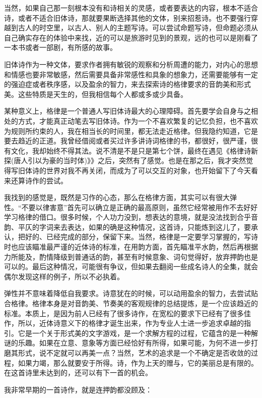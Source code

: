 \documentclass{article}
\begin{document}
当然，如果自己那一刻根本没有和诗相关的灵感，或者要表达的内容，根本不适合诗，或者不适合旧体诗，那就要果断选择其他的文体，别来招惹诗。也不要强行穿越到古人的时空里，以古人、别人的主题写诗。可以尝试命题写诗，但命题必须从自己确实存在的体验中来找，近的可以是旅游时见到的景观，远的也可以是刚看了一本书或者一部剧，有所感的故事。

旧体诗作为一种文体，要求作者拥有敏锐的观察和分析周遭的能力，对内心的思想和情感也要非常敏感，然后需要具备非常感性和具象的想象力，还需要能够有一定的强迫症或者秩序感，以及盈余的智力，来去探索诗的格律要求的音韵美和形式美。这些特质是天生的，但我相信每个人都或多或少具备。

某种意义上，格律是一个普通人写旧体诗最大的心理障碍。首先要学会自身与之相处的方式，才能真正动笔去写旧体诗。作为一个不喜欢繁复的记忆负担，也不喜欢为规则所约束的人，我在相当长的时间里，都无法走近格律。但我隐约知道，它是要去趋近的正道。我曾经借阅或者买过许多讲诗词格律的书，都很好，很严谨，很有文化，我却始终不得其法。说不清是不是只是第七个饼，最终在遇见《格律诗新探(唐人引以为豪的当时体)》》之后，突然有了感觉。也是在那之后，我才突然觉得写旧体诗的世界对我不再关闭，而成为了可以交互的对象，也开始留下了今天看来还算诗作的尝试。

我找到的感觉是，既然是习作的心态，那么在格律方面，其实可以有很大弹性。``不要以律害意''首先可以确立是正确的最高原则，虽然它经常被用作不去好好学习格律的借口。很多时候，个人功力没到，想表达的意境，就是没法找到合乎音韵、平仄的字词来去表达，如果的确是这种情况，这首诗，只能炼到这儿了，要承认，把好的、已经完成的部分，保留下来。当然，格律是一定要学习掌握的，写诗时也应该瞄准最严谨的近体诗的标准，在用韵方面，首先瞄准平水韵，然后再根据力所能及，酌情降级到普通话的韵，甚至有时候意象、词句觉得好，放弃押韵也是可以的。最后这种情况，可能很有争议，但如果去翻阅一些成名诗人的全集，就会偶尔发现这样的例子，所以不必执着。

弹性并不意味着降低自我要求。诗意犹在的时候，可以动用盈余的智力，去尝试贴合格律。格律本身是对音韵美、节奏美的客观规律的总结提炼，是一个应该趋近的标准。本质上，是因为前人已经有了很多诗作，在宽松的要求下已经有了很多佳作，所以，近体诗意义下的格律才诞生出来，作为专业人士进一步追求卓越的指引。它是一个关于形式美的文字游戏，是一个求解方程的过程，它蕴含的是一种解谜的乐趣。如果在立意、意象等方面已经恰好有所得，如果可能，为何不进一步打磨其形式，说不定就可以再美一点？当然，艺术的追求是一个不确定是否收敛的过程，如果力竭，那么就要安于所得。诗，作为上天的赠与，它的美丽总是有限的。在这首诗里未达到的，还可以有下一首的机会。

我非常早期的一首诗作，就是连押韵都没顾及：
\end{document}
